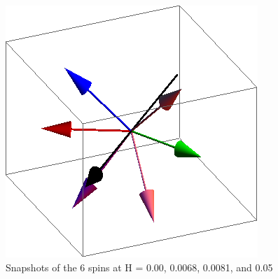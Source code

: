 \documentclass{article}
\begin{document}
\begin{figure}[ht]
\includegraphics[scale=0.27]{110/501S000to005R.png}
\caption{Snapshots of the 6 spins at H = 0.00, 0.0068, 0.0081, and 0.05}
\end{figure}
\clearpage
\end{document}
